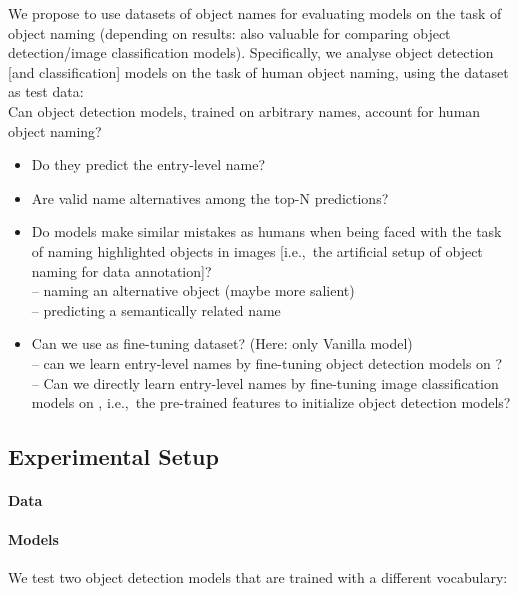 \iffalse
We propose to use datasets of object names for evaluating models on the task of object naming (depending on results: also valuable for comparing object detection/image classification models).
Specifically, we analyse object detection [and classification] models on the task of human object naming, using the \mn dataset as test data:\\
Can object detection models, trained on arbitrary names, account for human object naming?
\begin{itemize}
	\item Do they predict the entry-level name?
	\item Are valid name alternatives among the top-N predictions?
	\item Do models make similar mistakes as humans when being faced with the task of naming highlighted objects in images [i.e.,\ the artificial setup of object naming for data annotation]?\\
	-- naming an alternative object (maybe more salient)\\
	-- predicting a semantically related name
	\item Can we use \mn as fine-tuning dataset? (Here: only Vanilla model)\\
	-- can we learn entry-level names by fine-tuning object detection models on \mn?\\
	-- Can we directly learn entry-level names by fine-tuning image classification models on \mn, i.e.,\ the pre-trained features to initialize object detection models?
\end{itemize}

\subsection{Experimental Setup}
\label{sect:exp_setup}

\paragraph{Data}

\paragraph{Models}

We test two object detection models that are trained with a different vocabulary:

